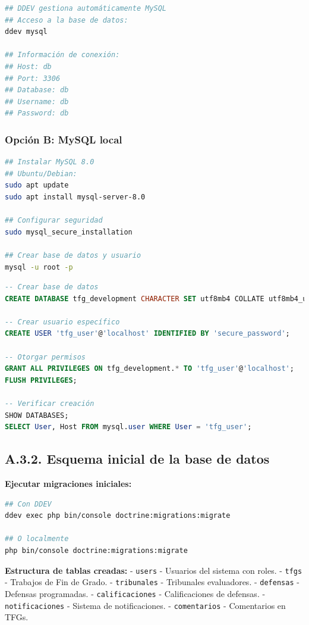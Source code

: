 \documentclass[12pt,a4paper,oneside]{report}
\providecommand{\passthrough}[1]{\texttt{#1}}
\begin{document}
\begin{lstlisting}[language=bash]
## DDEV gestiona automáticamente MySQL
## Acceso a la base de datos:
ddev mysql

## Información de conexión:
## Host: db
## Port: 3306  
## Database: db
## Username: db
## Password: db
\end{lstlisting}

\subsubsection{Opción B: MySQL local}\label{opciuxf3n-b-mysql-local}

\begin{lstlisting}[language=bash]
## Instalar MySQL 8.0
## Ubuntu/Debian:
sudo apt update
sudo apt install mysql-server-8.0

## Configurar seguridad
sudo mysql_secure_installation

## Crear base de datos y usuario
mysql -u root -p
\end{lstlisting}

\begin{lstlisting}[language=SQL]
-- Crear base de datos
CREATE DATABASE tfg_development CHARACTER SET utf8mb4 COLLATE utf8mb4_unicode_ci;

-- Crear usuario específico
CREATE USER 'tfg_user'@'localhost' IDENTIFIED BY 'secure_password';

-- Otorgar permisos
GRANT ALL PRIVILEGES ON tfg_development.* TO 'tfg_user'@'localhost';
FLUSH PRIVILEGES;

-- Verificar creación
SHOW DATABASES;
SELECT User, Host FROM mysql.user WHERE User = 'tfg_user';
\end{lstlisting}

\subsection{A.3.2. Esquema inicial de la base de
datos}\label{a.3.2.-esquema-inicial-de-la-base-de-datos}

\textbf{Ejecutar migraciones iniciales:}

\begin{lstlisting}[language=bash]
## Con DDEV
ddev exec php bin/console doctrine:migrations:migrate

## O localmente
php bin/console doctrine:migrations:migrate
\end{lstlisting}

\textbf{Estructura de tablas creadas:} - \passthrough{\lstinline!users!}
- Usuarios del sistema con roles. - \passthrough{\lstinline!tfgs!} -
Trabajos de Fin de Grado. - \passthrough{\lstinline!tribunales!} -
Tribunales evaluadores. - \passthrough{\lstinline!defensas!} - Defensas
programadas. - \passthrough{\lstinline!calificaciones!} - Calificaciones
de defensas. - \passthrough{\lstinline!notificaciones!} - Sistema de
notificaciones. - \passthrough{\lstinline!comentarios!} - Comentarios en
TFGs.
\end{document}
